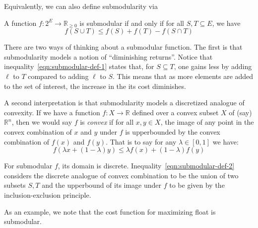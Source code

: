 \documentclass{article}
\begin{document}
Equivalently, we can also define submodularity via

\begin{definition}
A function $f: 2^E \rightarrow \mathbb{R}_{\geq 0}$ is submodular if and only if for all $S, T \subseteq E$, we have
\begin{equation}\label{eqn:submodular-def-2}
f(S \cup T) \leq f(S) + f(T) - f(S \cap T)
\end{equation}
\end{definition}

There are two ways of thinking about a submodular function. The first is that submodularity models a notion of ``diminishing returns''. Notice that inequality~\ref{eqn:submodular-def-1} states that, for $S \subseteq T$, one gains less by adding $\ell$ to $T$ compared to adding $\ell$ to $S$. This means that as more elements are added to the set of interest, the increase in the its cost diminishes.


A second interpretation is that submodularity models a discretized analogue of convexity. If we have a function $f: X \rightarrow \mathbb{R}$ defined over a convex subset $X$ of (say) $\mathbb{R}^n$, then we would say $f$ is \emph{convex} if for all $x, y \in X$, the image of any point in the convex combination of $x$ and $y$ under $f$ is upperbounded by the convex combination of $f(x)$ and $f(y)$. That is to say for any $\lambda \in [0, 1]$ we have:
\begin{equation*}
f(\lambda x + (1 - \lambda) y) \leq \lambda f(x) + (1 - \lambda) f(y)
\end{equation*}

For submodular $f$, its domain is discrete. Inequality~\ref{eqn:submodular-def-2} considers the discrete analogue of convex combination to be the union of two subsets $S, T$ and the upperbound of its image under $f$ to be given by the inclusion-exclusion principle.


As an example, we note that the cost function for maximizing float is submodular.
\end{document}
